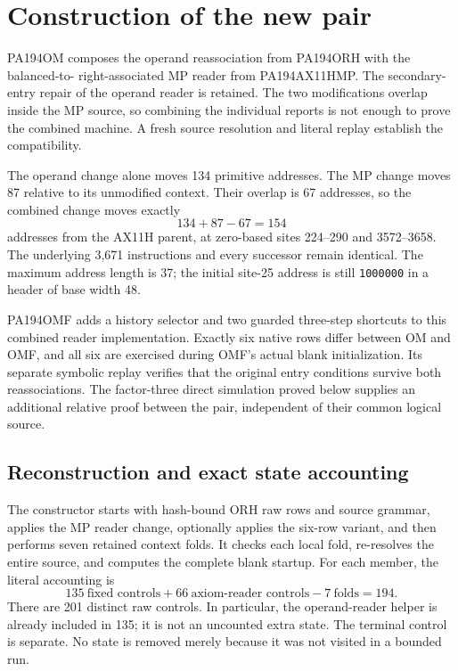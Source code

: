 \documentclass[11pt,a4paper]{article}
\begin{document}
\section{Construction of the new pair}

PA194OM composes the operand reassociation from PA194ORH with the balanced-to-
right-associated MP reader from PA194AX11HMP. The secondary-entry repair
of the operand reader is retained. The two modifications overlap inside
the MP source, so combining the individual reports is not enough to prove
the combined machine. A fresh source resolution and literal replay establish
the compatibility.

The operand change alone moves 134 primitive addresses. The MP change
moves 87 relative to its unmodified context. Their overlap is 67 addresses,
so the combined change moves exactly
\[
                       134+87-67=154
\]
addresses from the AX11H parent, at zero-based sites 224--290 and
3572--3658. The underlying 3,671 instructions and every successor remain
identical. The maximum address length is 37; the initial site-25 address
is still \texttt{1000000} in a header of base width 48.

PA194OMF adds a history selector and two guarded three-step shortcuts
to this combined reader implementation. Exactly six native rows differ
between OM and OMF, and all six are exercised during OMF's actual blank
initialization. Its separate symbolic replay verifies that the original
entry conditions survive both reassociations. The factor-three direct
simulation proved below supplies an additional relative proof between
the pair, independent of their common logical source.

\subsection{Reconstruction and exact state accounting}

The constructor starts with hash-bound ORH raw rows and source grammar,
applies the MP reader change, optionally applies the six-row variant, and
then performs seven retained context folds. It checks each local fold,
re-resolves the entire source, and computes the complete blank startup.
For each member, the literal accounting is
\[
              135\ \text{fixed controls}
              +66\ \text{axiom-reader controls}
              -7\ \text{folds}=194.
\]
There are 201 distinct raw controls. In particular, the operand-reader
helper is already included in 135; it is not an uncounted extra state.
The terminal control is separate. No state is removed merely because it
was not visited in a bounded run.
\end{document}
